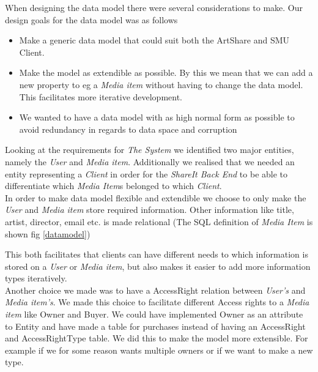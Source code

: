\documentclass[../report.tex]{subfiles}
\begin{document}
When designing the data model there were several considerations to make. Our design goals for the data model was as follows
\begin{itemize}
\item Make a generic data model that could suit both the ArtShare and SMU Client.
\item Make the model as extendible as possible. By this we mean that we can add a new property to eg a \textit{Media item} without having to change the data model. This facilitates more iterative development.
\item We wanted to have a data model with as high normal form as possible to avoid redundancy in regards to data space and corruption
\end{itemize} 






Looking at the requirements for \textit{The System} we identified two major entities, namely the \textit{User} and \textit{Media item}. Additionally we realised that we needed an entity representing a \textit{Client} in order for the \textit{ShareIt Back End} to be able to differentiate which \textit{Media Item}s belonged to which \textit{Client}. \\

In order to make data model flexible and extendible we choose to only make the \textit{User} and \textit{Media item} store required information. Other information like title, artist, director, email etc. is made relational (The SQL definition of \textit{Media Item} is shown fig \ref{datamodel})

This both facilitates that clients can have different needs to which information is stored on a \textit{User} or \textit{Media item}, but also makes it easier to add more information types iteratively.\\

Another choice we made was to have a AccessRight relation between \textit{User's} and \textit{Media item's}. We made this choice to facilitate different Access rights to a \textit{Media item} like Owner and Buyer. We could have implemented Owner as an attribute to Entity and have made a table for purchases instead of having an AccessRight and AccessRightType table. We did this to make the model more extensible. For example if we for some reason wants multiple owners or if we want to make a new type. 
\end{document}
